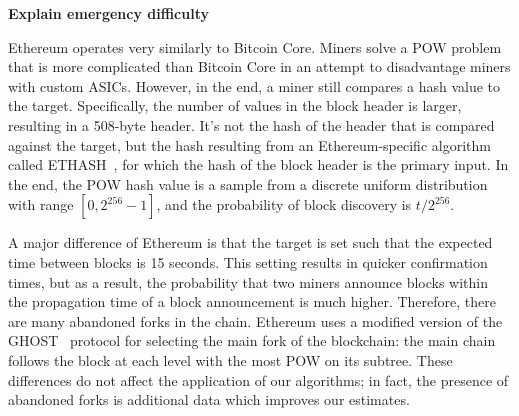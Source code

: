 \textbf{Explain emergency difficulty}

 Ethereum operates very similarly to Bitcoin Core. Miners solve a POW problem that is more complicated
than Bitcoin Core in an attempt to disadvantage miners with custom ASICs.
However, in the end, a miner still compares a hash value to the target.
Specifically, the number of values in the block header is larger,
resulting in a 508-byte header. It's not the hash of the header that
is compared against the target, but the hash resulting from an
Ethereum-specific algorithm called ETHASH~\cite{ETHASH}, for which the
hash of the block header is the primary input. In the end, the POW
hash value is a sample from a discrete uniform distribution with range
$[0,2^{256}-1]$, and the probability of block discovery is
${t/2^{256}}$.

A major difference of Ethereum is that the target is set such that the
expected time between blocks is 15 seconds. This setting results
in quicker confirmation times, but as a result, the probability that two
miners announce blocks within the propagation time of a block
announcement is much higher. Therefore, there are many abandoned
forks in the chain. Ethereum uses a modified version of the GHOST~\cite{Sompolinsky:2015}
protocol for selecting the main fork of the blockchain: the main chain
follows the block at each level with the most POW on its subtree.
These differences do not affect the application of our algorithms; in
fact, the presence of abandoned forks is additional data which improves our
estimates.


